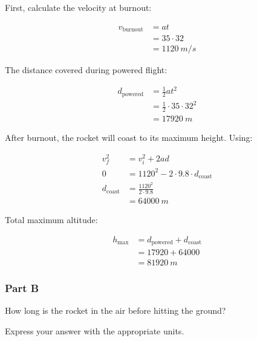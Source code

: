 \begin{solution}
	First, calculate the velocity at burnout:

	\begin{align*}
		v_{\mathrm{burnout}} &= a t \\
		&= 35 \cdot 32 \\
		&= \SI{1120}{m/s}
	\end{align*}

	The distance covered during powered flight:

	\begin{align*}
		d_{\mathrm{powered}} &= \frac{1}{2} a t^2 \\
		&= \frac{1}{2} \cdot 35 \cdot 32^2 \\
		&= \SI{17920}{m}
	\end{align*}

	After burnout, the rocket will coast to its maximum height. Using:

	\begin{align*}
		v_f^2 &= v_i^2 + 2 a d \\
		0 &= 1120^2 - 2 \cdot 9.8 \cdot d_{\mathrm{coast}} \\
		d_{\mathrm{coast}} &= \frac{1120^2}{2 \cdot 9.8} \\
		&= \SI{64000}{m}
	\end{align*}

	Total maximum altitude:

	\begin{align*}
		h_{\mathrm{max}} &= d_{\mathrm{powered}} + d_{\mathrm{coast}} \\
		&= 17920 + 64000 \\
		&= \boxed{\SI{81920}{m}}
	\end{align*}
\end{solution}

\subsubsection{Part B}
How long is the rocket in the air before hitting the ground?

Express your answer with the appropriate units.

